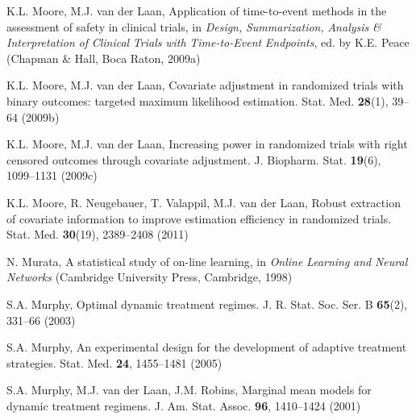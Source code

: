 \begin{list}{}{\setlength{\leftmargin}{2.1em}\setlength{\labelwidth}{0pt}
  \setlength{\labelsep}{0pt}\setlength{\itemindent}{-2.1em}
  \setlength{\parsep}{0pt}\setlength{\itemsep}{2pt}\setlength{\topsep}{0pt}}
\item\label{refentry:REF230}K.L. Moore, M.J. van der Laan, Application of time-to-event methods in the assessment of safety in clinical trials, in \textit{Design,} \textit{Summarization,} \textit{Analysis} \textit{\&} \textit{Interpretation} \textit{of} \textit{Clinical} \textit{Trials} \textit{with} \textit{Time-to-Event} \textit{Endpoints}, ed. by K.E. Peace (Chapman \& Hall, Boca Raton, 2009a)\label{refend:REF230}
\item\label{refentry:REF231}K.L. Moore, M.J. van der Laan, Covariate adjustment in randomized trials with binary outcomes: targeted maximum likelihood estimation. Stat. Med. \textbf{28}(1), 39--64 (2009b)\label{refend:REF231}
\item\label{refentry:REF232}K.L. Moore, M.J. van der Laan, Increasing power in randomized trials with right censored outcomes through covariate adjustment. J. Biopharm. Stat. \textbf{19}(6), 1099--1131 (2009c)\label{refend:REF232}
\item\label{refentry:REF233}K.L. Moore, R. Neugebauer, T. Valappil, M.J. van der Laan, Robust extraction of covariate information to improve estimation efficiency in randomized trials. Stat. Med. \textbf{30}(19), 2389--2408 (2011)\label{refend:REF233}
\item\label{refentry:REF234}N. Murata, A statistical study of on-line learning, in \textit{Online} \textit{Learning} \textit{and} \textit{Neural} \textit{Networks} (Cambridge University Press, Cambridge, 1998)\label{refend:REF234}
\item\label{refentry:REF235}S.A. Murphy, Optimal dynamic treatment regimes. J. R. Stat. Soc. Ser. B \textbf{65}(2), 331--66 (2003)\label{refend:REF235}
\item\label{refentry:REF236}S.A. Murphy, An experimental design for the development of adaptive treatment strategies. Stat. Med. \textbf{24}, 1455--1481 (2005)\label{refend:REF236}
\item\label{refentry:REF237}S.A. Murphy, M.J. van der Laan, J.M. Robins, Marginal mean models for dynamic treatment regimens. J. Am. Stat. Assoc. \textbf{96}, 1410--1424 (2001)\label{refend:REF237}

\end{list}
